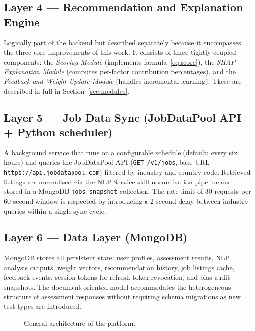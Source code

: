 \subsection*{Layer 4 --- Recommendation and Explanation Engine}

Logically part of the backend but described separately because it encompasses
the three core improvements of this work. It consists of three tightly coupled
components: the \emph{Scoring Module} (implements formula~\eqref{eq:score}),
the \emph{SHAP Explanation Module} (computes per-factor contribution
percentages), and the \emph{Feedback and Weight Update Module} (handles
incremental learning). These are described in full in
Section~\ref{sec:modules}.

\subsection*{Layer 5 --- Job Data Sync (JobDataPool API + Python scheduler)}

A background service that runs on a configurable schedule (default: every six
hours) and queries the JobDataPool API (\texttt{GET /v1/jobs}, base URL
\texttt{https://api.jobdatapool.com}) filtered by industry and country code.
Retrieved listings are normalised via the NLP Service skill normalisation
pipeline and stored in a MongoDB \texttt{jobs\_snapshot} collection. The rate
limit of 30 requests per 60-second window is respected by introducing a
2-second delay between industry queries within a single sync cycle.

\subsection*{Layer 6 --- Data Layer (MongoDB)}

MongoDB stores all persistent state: user profiles, assessment results, NLP
analysis outputs, weight vectors, recommendation history, job listings cache,
feedback events, session tokens for refresh-token revocation, and bias audit
snapshots. The document-oriented model accommodates the heterogeneous structure
of assessment responses without requiring schema migrations as new test types
are introduced.

\begin{figure}[h]
  \centering
  \caption{General architecture of the platform.}
  \label{fig:architecture}
\end{figure}

